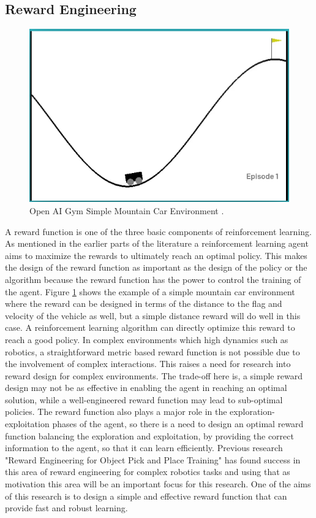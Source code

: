 \subsection{Reward Engineering}

\begin{figure}[h!]
    \centering
    \includegraphics[width=\textwidth]{images/MC.png}
    \caption{Open AI Gym Simple Mountain Car Environment \cite{brockman2016openai}. }
    \label{fig:MC}
\end{figure}

A reward function is one of the three basic components of reinforcement learning. As mentioned in the earlier parts of the literature a reinforcement learning agent aims to maximize the rewards to ultimately reach an optimal policy. This makes the design of the reward function as important as the design of the policy or the algorithm because the reward function has the power to control the training of the agent. Figure \ref{fig:MC} shows the example of a simple mountain car environment where the reward can be designed in terms of the distance to the flag and velocity of the vehicle as well, but a simple distance reward will do well in this case. A reinforcement learning algorithm can directly optimize this reward to reach a good policy. In complex environments which high dynamics such as robotics, a straightforward metric based reward function is not possible due to the involvement of complex interactions. This raises a need for research into reward design for complex environments. The trade-off here is, a simple reward design may not be as effective in enabling the agent in reaching an optimal solution, while a well-engineered reward function may lead to sub-optimal policies. The reward function also plays a major role in the exploration-exploitation phases of the agent, so there is a need to design an optimal reward function balancing the exploration and exploitation, by providing the correct information to the agent, so that it can learn efficiently. Previous research "Reward Engineering for Object Pick and Place Training" \cite{nagpal2020reward} has found success in this area of reward engineering for complex robotics tasks and using that as motivation this area will be an important focus for this research. One of the aims of this research is to design a simple and effective reward function that can provide fast and robust learning. \\

